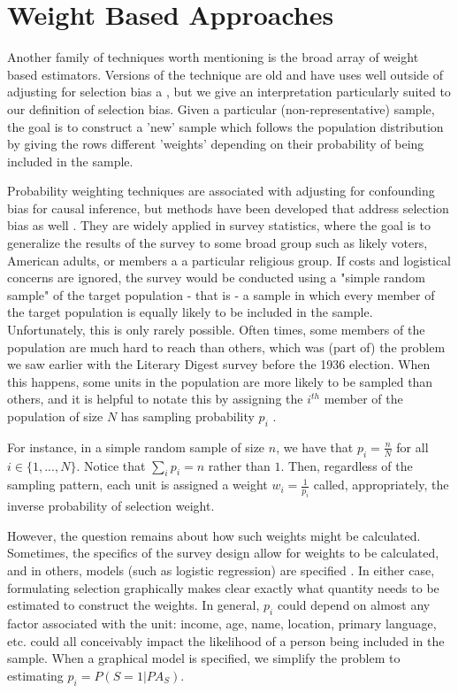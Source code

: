 \documentclass[12pt,twoside]{reedthesis}
\theoremstyle{definition}
\begin{document}
\section{Weight Based Approaches}

Another family of techniques worth mentioning is the broad array of weight based estimators. Versions of the technique are old and have uses well outside of adjusting for selection bias a \citep{Horvitz_1952}, but we give an interpretation particularly suited to our definition of selection bias. Given a particular (non-representative) sample, the goal is to construct a 'new' sample which follows the population distribution by giving the rows different 'weights' depending on their probability of being included in the sample. 

Probability weighting techniques are associated with adjusting for confounding bias for causal inference, but methods have been developed that address selection bias as well \citep{Correa_2017}. They are  widely applied in survey statistics, where the goal is to generalize the results of the survey to some broad group such as likely voters, American adults, or members a a particular religious group. If costs and logistical concerns are ignored, the survey would be conducted using a "simple random sample" of the target population - that is - a sample in which every member of the target population is equally likely to be included in the sample. Unfortunately, this is only rarely possible. Often times, some members of the population are much hard to reach than others, which was (part of) the problem we saw earlier with the Literary Digest survey before the 1936 election. When this happens, some units in the population are more likely to be sampled than others, and it is helpful to notate this by assigning the $i^{th}$ member of the population of size $N$ has sampling probability $p_i$ \citep{Valliant_2018}.

For instance, in a simple random sample of size $n$, we have that $p_i = \frac{n}{N}$ for all $i \in \{1,...,N\}$. Notice that $\sum_i p_i  = n$ rather than $1$. Then, regardless of the sampling pattern, each unit is assigned a weight $w_i = \frac{1}{p_i}$ called, appropriately, the inverse probability of selection weight.

However, the question remains about how such weights might be calculated. Sometimes, the specifics of the survey design allow for weights to be calculated, and in others, models (such as logistic regression) are specified \citep{Valliant_2018}. In either case, formulating selection graphically makes clear exactly what quantity needs to be estimated to construct the weights. In general, $p_i$ could depend on almost any factor associated with the unit: income, age, name, location, primary language, etc. could all conceivably impact the likelihood  of a person being included in the sample. When a graphical model is specified, we simplify the problem to estimating $p_i = P(S = 1 | PA_S)$. 
\end{document}
